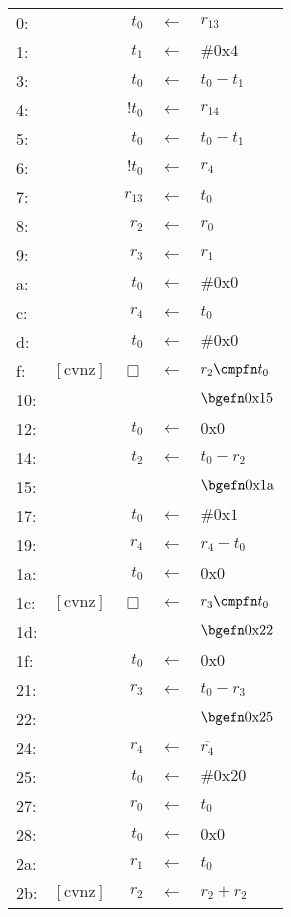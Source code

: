 \begin{longtable}{lrrcl}
0:& & $t_0$ & $\leftarrow$ & $r_{13}$\\
1:& & $t_1$ & $\leftarrow$ & $\#\mathrm{0x4}$\\
3:& & $t_0$ & $\leftarrow$ & $t_0 - t_1$\\
4:& & $!t_0$ & $\leftarrow$ & $r_{14}$\\
5:& & $t_0$ & $\leftarrow$ & $t_0 - t_1$\\
6:& & $!t_0$ & $\leftarrow$ & $r_4$\\
7:& & $r_{13}$ & $\leftarrow$ & $t_0$\\
8:& & $r_2$ & $\leftarrow$ & $r_0$\\
9:& & $r_3$ & $\leftarrow$ & $r_1$\\
a:& & $t_0$ & $\leftarrow$ & $\#\mathrm{0x0}$\\
c:& & $r_4$ & $\leftarrow$ & $t_0$\\
d:& & $t_0$ & $\leftarrow$ & $\#\mathrm{0x0}$\\
f:& $\mathrm{[cvnz]}$ & $\Box$ & $\leftarrow$ & $r_2 \cmpfn t_0$\\
10:& & & & $\bgefn \mathrm{0x15}$\\
12:& & $t_0$ & $\leftarrow$ & $\mathrm{0x0}$\\
14:& & $t_2$ & $\leftarrow$ & $t_0 - r_2$\\
15:& & & & $\bgefn \mathrm{0x1a}$\\
17:& & $t_0$ & $\leftarrow$ & $\#\mathrm{0x1}$\\
19:& & $r_4$ & $\leftarrow$ & $r_4 - t_0$\\
1a:& & $t_0$ & $\leftarrow$ & $\mathrm{0x0}$\\
1c:& $\mathrm{[cvnz]}$ & $\Box$ & $\leftarrow$ & $r_3 \cmpfn t_0$\\
1d:& & & & $\bgefn \mathrm{0x22}$\\
1f:& & $t_0$ & $\leftarrow$ & $\mathrm{0x0}$\\
21:& & $r_3$ & $\leftarrow$ & $t_0 - r_3$\\
22:& & & & $\bgefn \mathrm{0x25}$\\
24:& & $r_4$ & $\leftarrow$ & $\overline{r_4}$\\
25:& & $t_0$ & $\leftarrow$ & $\#\mathrm{0x20}$\\
27:& & $r_0$ & $\leftarrow$ & $t_0$\\
28:& & $t_0$ & $\leftarrow$ & $\mathrm{0x0}$\\
2a:& & $r_1$ & $\leftarrow$ & $t_0$\\
2b:& $\mathrm{[cvnz]}$ & $r_2$ & $\leftarrow$ & $r_2 + r_2$\\

\end{longtable}
